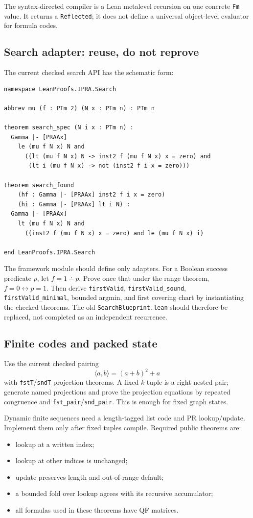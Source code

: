 The syntax-directed compiler is a Lean metalevel recursion on one concrete \texttt{Fm} value.  It returns a \texttt{Reflected}; it does not define a universal object-level evaluator for formula codes.

\subsection{Search adapter: reuse, do not reprove}

The current checked search API has the schematic form:

\begin{lstlisting}
namespace LeanProofs.IPRA.Search

abbrev mu (f : PTm 2) (N x : PTm n) : PTm n

theorem search_spec (N i x : PTm n) :
  Gamma |- [PRAAx]
    le (mu f N x) N and
      ((lt (mu f N x) N -> inst2 f (mu f N x) x = zero) and
       (lt i (mu f N x) -> not (inst2 f i x = zero)))

theorem search_found
    (hf : Gamma |- [PRAAx] inst2 f i x = zero)
    (hi : Gamma |- [PRAAx] lt i N) :
  Gamma |- [PRAAx]
    lt (mu f N x) N and
      ((inst2 f (mu f N x) x = zero) and le (mu f N x) i)

end LeanProofs.IPRA.Search
\end{lstlisting}
The framework module should define only adapters.  For a Boolean success predicate \(p\), let \(f=1\dotminus p\).  Prove once that under the range theorem, \(f=0\leftrightarrow p=1\).  Then derive \texttt{firstValid}, \texttt{firstValid\_sound}, \texttt{firstValid\_minimal}, bounded argmin, and first covering chart by instantiating the checked theorems.  The old \texttt{SearchBlueprint.lean} should therefore be replaced, not completed as an independent recurrence.

\subsection{Finite codes and packed state}

Use the current checked pairing
\[
  \langle a,b\rangle=(a+b)^2+a
\]
with \texttt{fstT}/\texttt{sndT} projection theorems.  A fixed \(k\)-tuple is a right-nested pair; generate named projections and prove the projection equations by repeated congruence and \texttt{fst\_pair}/\texttt{snd\_pair}.  This is enough for fixed graph states.

Dynamic finite sequences need a length-tagged list code and PR lookup/update.  Implement them only after fixed tuples compile.  Required public theorems are:
\begin{itemize}
  \item lookup at a written index;
  \item lookup at other indices is unchanged;
  \item update preserves length and out-of-range default;
  \item a bounded fold over lookup agrees with its recursive accumulator;
  \item all formulas used in these theorems have QF matrices.
\end{itemize}

